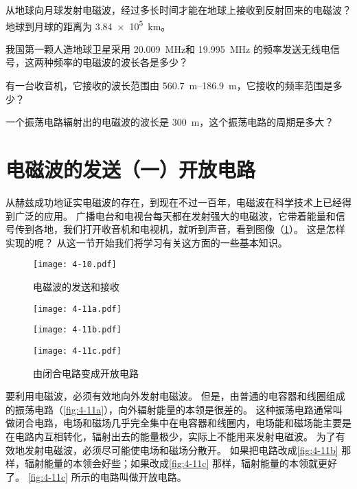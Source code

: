 \begin{Practice}
\begin{question}
	\item 从地球向月球发射电磁波，经过多长时间才能在地球上接收到反射回来的电磁波？地球到月球的距离为 \qty{3.84e5}{km}。
	\item 我国第一颗人造地球卫星采用 \qty{20.009}{MHz}和 \qty{19.995}{MHz} 的频率发送无线电信号，这两种频率的电磁波的波长各是多少？
	\item 有一台收音机，它接收的波长范围由 \qtyrange{560.7}{186.9}{m}，它接收的频率范围是多少？
	\item 一个振荡电路辐射出的电磁波的波长是 \qty{300}{m}，这个振荡电路的周期是多大？
\end{question}
\end{Practice}

\section{电磁波的发送（一）\texorpdfstring{\quad}{ }开放电路}
从赫兹成功地证实电磁波的存在，到现在不过一百年，电磁波在科学技术上已经得到广泛的应用。
广播电台和电视台每天都在发射强大的电磁波，它带着能量和信号传到各地，我们打开收音机和电视机，就听到声音，看到图像（\cref{fig:4-10}）。
这是怎样实现的呢？
从这一节开始我们将学习有关这方面的一些基本知识。
\begin{figure}
	\texttt{[image: 4-10.pdf]}
	\caption{电磁波的发送和接收}\label{fig:4-10}
\end{figure}

\begin{figure}
	\begin{minipage}{0.32\linewidth}\centering
		\texttt{[image: 4-11a.pdf]}
	  \subcaption{}\label{fig:4-11a}
	\end{minipage}
	\begin{minipage}{0.32\linewidth}\centering
		\texttt{[image: 4-11b.pdf]}
	  \subcaption{}\label{fig:4-11b}
	\end{minipage}
	\begin{minipage}{0.32\linewidth}\centering
		\texttt{[image: 4-11c.pdf]}
	  \subcaption{}\label{fig:4-11c}
	\end{minipage}
	\caption{由闭合电路变成开放电路}\label{fig:4-11}
\end{figure}

要利用电磁波，必须有效地向外发射电磁波。
但是，由普通的电容器和线圈组成的振荡电路（\cref{fig:4-11a}），向外辐射能量的本领是很差的。
这种振荡电路通常叫做闭合电路，电场和磁场几乎完全集中在电容器和线圈内，电场能和磁场能主要是在电路内互相转化，辐射出去的能量极少，实际上不能用来发射电磁波。
为了有效地发射电磁波，必须尽可能使电场和磁场分散开。
如果把电路改成\cref{fig:4-11b} 那样，辐射能量的本领会好些；如果改成\cref{fig:4-11c} 那样，辐射能量的本领就更好了。
\cref{fig:4-11c} 所示的电路叫做开放电路。

